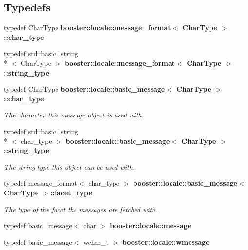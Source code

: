 \subsection*{Typedefs}
\begin{DoxyCompactItemize}
\item 
typedef Char\-Type {\bf booster\-::locale\-::message\-\_\-format$<$ Char\-Type $>$\-::char\-\_\-type}
\item 
typedef std\-::basic\-\_\-string\\*
$<$ Char\-Type $>$ {\bf booster\-::locale\-::message\-\_\-format$<$ Char\-Type $>$\-::string\-\_\-type}
\item 
typedef Char\-Type {\bf booster\-::locale\-::basic\-\_\-message$<$ Char\-Type $>$\-::char\-\_\-type}\label{group__message_ga5cb546ceb92830ddf7ea2913e6651b9e}

\begin{DoxyCompactList}\small\item\em The character this message object is used with. \end{DoxyCompactList}\item 
typedef std\-::basic\-\_\-string\\*
$<$ char\-\_\-type $>$ {\bf booster\-::locale\-::basic\-\_\-message$<$ Char\-Type $>$\-::string\-\_\-type}\label{group__message_ga90b2267af78f4df23fb621e3c1443707}

\begin{DoxyCompactList}\small\item\em The string type this object can be used with. \end{DoxyCompactList}\item 
typedef message\-\_\-format$<$ char\-\_\-type $>$ {\bf booster\-::locale\-::basic\-\_\-message$<$ Char\-Type $>$\-::facet\-\_\-type}\label{group__message_ga07188bff8c00be4a1b81323d45525b65}

\begin{DoxyCompactList}\small\item\em The type of the facet the messages are fetched with. \end{DoxyCompactList}\item 
typedef basic\-\_\-message$<$ char $>$ {\bf booster\-::locale\-::message}
\item 
typedef basic\-\_\-message$<$ wchar\-\_\-t $>$ {\bf booster\-::locale\-::wmessage}
\end{DoxyCompactItemize}
